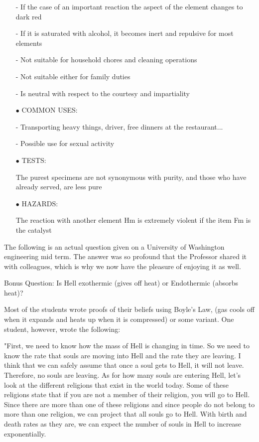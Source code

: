 \begin{itemize}
- If the case of an important reaction the aspect of the element changes to dark red

- If it is saturated with alcohol, it becomes inert and repulsive for most elements

- Not suitable for household chores and cleaning operations 

- Not suitable either for family duties

- Is neutral with respect to the courtesy and impartiality 

	\item[$\bullet$] COMMON USES:

- Transporting heavy things, driver, free dinners at the restaurant...

- Possible use for sexual activity

	\item[$\bullet$] TESTS:

The purest specimens are not synonymous with purity, and those who have already served, are less pure

	\item[$\bullet$] HAZARDS:

The reaction with another element Hm is extremely violent if the item Fm is the catalyst
\end{itemize}
\begin{center}\underline{\hspace{5 cm}}\end{center}

The following is an actual question given on a University of Washington engineering mid term. The answer was so profound that the Professor shared it with colleagues, which is why we now have the pleasure of enjoying it as well.

Bonus Question: Is Hell exothermic (gives off heat) or Endothermic (absorbs heat)?

Most of the students wrote proofs of their beliefs using Boyle's Law, (gas cools off when it expands and heats up when it is compressed) or some variant. One student, however, wrote the following:

"First, we need to know how the mass of Hell is changing in time. So we need to know the rate that souls are moving into Hell and the rate they are leaving. I think that we can safely assume that once a soul gets to Hell, it will not leave. Therefore, no souls are leaving. As for how many souls are entering Hell, let's look at the different religions that exist in the world today. Some of these religions state that if you are not a member of their religion, you will go to Hell. Since there are more than one of these religions and since people do not belong to more than one religion, we can project that all souls go to Hell. With birth and death rates as they are, we can expect the number of souls in Hell to increase exponentially.

